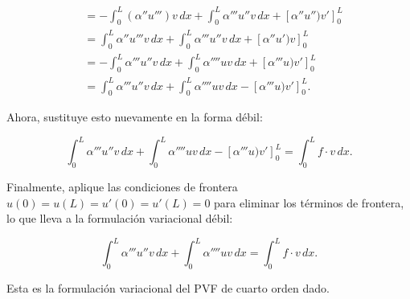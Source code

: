 \begin{frame}
    \begin{solution}
        \begin{align*}
             & = -\int_0^L (\alpha'' u''')v \,dx + \int_0^L \alpha''' u''v \,dx + [\alpha'' u'')v']_0^L \\
             & = \int_0^L \alpha'' u'''v \,dx + \int_0^L \alpha''' u''v \,dx + [\alpha'' u')v]_0^L      \\
             & = -\int_0^L \alpha''' u''v \,dx + \int_0^L \alpha'''' u v \,dx + [\alpha''' u)v']_0^L    \\
             & = \int_0^L \alpha''' u''v \,dx + \int_0^L \alpha'''' u v \,dx - [\alpha''' u)v']_0^L.
        \end{align*}

        Ahora, sustituye esto nuevamente en la forma débil:

        \begin{equation*}
            \int_0^L \alpha''' u''v \,dx + \int_0^L \alpha'''' u v \,dx - [\alpha''' u)v']_0^L = \int_0^L f \cdot v \,dx.
        \end{equation*}

        Finalmente, aplique las condiciones de frontera \( u(0) = u(L) = u'(0) = u'(L) = 0 \) para eliminar los términos de frontera, lo que lleva a la formulación variacional débil:

        \begin{equation*}
            \int_0^L \alpha''' u''v \,dx + \int_0^L \alpha'''' u v \,dx = \int_0^L f \cdot v \,dx.
        \end{equation*}

        Esta es la formulación variacional del PVF de cuarto orden dado.
    \end{solution}
\end{frame}